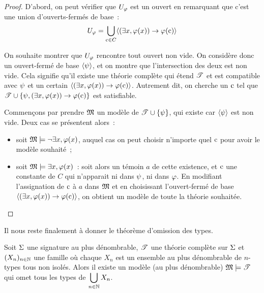\begin{proof}
  D'abord, on peut vérifier que $U_{\varphi}$ est un ouvert en remarquant
  que c'est une union d'ouverts-fermés de base~:
  \[U_{\varphi} = \bigcup_{\mathrm{c} \in C}
  \langle (\exists x, \varphi(x))\to\varphi(\mathrm{c})\rangle\]
  
  On souhaite montrer que $U_{\varphi}$ rencontre tout ouvert non vide. On
  considère donc un ouvert-fermé de base $\langle \psi\rangle$, et on montre
  que l'intersection des deux est non vide. Cela signifie qu'il existe une
  théorie complète qui étend $\mathscr T$ et est compatible avec $\psi$ et un
  certain $\langle(\exists x,\varphi(x))\to\varphi(\mathrm{c})\rangle$. Autrement
  dit, on cherche un $\mathrm{c}$ tel que
  $\mathscr T\cup\{\psi,(\exists x,\varphi(x))\to\varphi(\mathrm{c})\}$ est satisfiable.

  Commençons par prendre $\mathfrak{M}$ un modèle de $\mathscr T\cup\{\psi\}$, qui
  existe car $\langle\psi\rangle$ est non vide. Deux cas se présentent alors~:
  \begin{itemize}
  \item soit $\mathfrak{M}\models\lnot\exists x, \varphi(x)$, auquel cas on peut
    choisir n'importe quel $\mathrm{c}$ pour avoir le modèle souhaité~;
  \item soit $\mathfrak{M}\models\exists x, \varphi(x)$~: soit alors un témoin
    $a$ de cette existence, et $\mathrm{c}$ une constante de $C$ qui n'apparait
    ni dans $\psi$, ni dans $\varphi$. En modifiant l'assignation de $\mathrm{c}$
    à $a$ dans $\mathfrak{M}$ et en choisissant l'ouvert-fermé de base
    $\langle (\exists x,\varphi(x))\to\varphi(\mathrm{c})\rangle$, on obtient un modèle
    de toute la théorie souhaitée.\qedhere
  \end{itemize}
\end{proof}

\noindent
Il nous reste finalement à donner le théorème d'omission des types.

\begin{theorem}
  Soit $\Sigma$ une signature au plus dénombrable, $\mathscr T$ une théorie complète
  sur $\Sigma$ et $(X_n)_{n\in\mathbb N}$ une famille où chaque $X_n$ est un
  ensemble au plus dénombrable de $n$-types tous non isolés. Alors il existe un
  modèle (au plus dénombrable) $\mathfrak{M}\models\mathscr T$ qui omet tous les types de
  $\displaystyle\bigcup_{n \in \mathbb N} X_n$.
\end{theorem}

